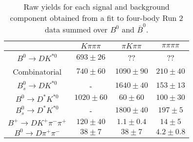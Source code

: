 \begin{table}
  \centering
  \begin{tabular}{cccc}
      \toprule
       & $K\pi\pi\pi$ & $\pi K\pi\pi$ & $\pi\pi\pi\pi$ \\
      \midrule
      $B^0 \to DK^{*0}$ & $693 \pm 26$ & ?? & ?? \\
      Combinatorial & $740 \pm 60$ & $1090 \pm 90$ & $210 \pm 40$ \\
      $B^0_s \to DK^{*0}$ & \-- & $1640 \pm 40$ & $153 \pm 13$ \\
      $B^0 \to D^*K^{*0}$ & $1020 \pm 60$ & $60 \pm 60$ & $100 \pm 30$ \\
      $B^0_s \to D^*K^{*0}$ & \-- & $1800 \pm 40$ & $197 \pm 5$ \\
      $B^+ \to DK^+\pi^-\pi^+$ & $120 \pm 40$ & $1.1 \pm 0.4$ & $14 \pm 5$ \\
      $B^0 \to D\pi^+\pi^-$ & $38 \pm 7$ & $38 \pm 7$ & $4.2 \pm 0.8$ \\
      \bottomrule
      \end{tabular}
  \caption{Raw yields for each signal and background component obtained from a fit to four-body Run 2 data summed over $B^0$ and $\bar{B}^0$.}
\label{tab:yields_combined_4body_run2}
\end{table}

